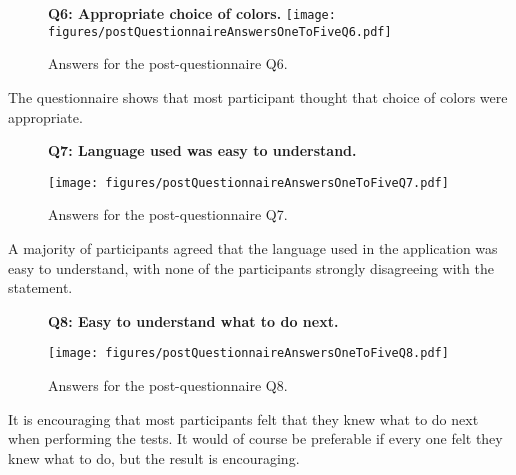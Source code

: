     \begin{figure}[h!]
      \begin{center}
        \textbf{Q6: Appropriate choice of colors.}
        \texttt{[image: figures/postQuestionnaireAnswersOneToFiveQ6.pdf]}
        \vspace{-1cm}
        \caption{Answers for the post-questionnaire Q6.}
      \end{center}
    \end{figure}

    The questionnaire shows that most participant thought that choice of
    colors were appropriate.

    \begin{figure}[h!]
      \textbf{Q7: Language used was easy to understand.}
      \begin{center}
        \texttt{[image: figures/postQuestionnaireAnswersOneToFiveQ7.pdf]}
        \vspace{-1cm}
        \caption{Answers for the post-questionnaire Q7.}
      \end{center}
    \end{figure}

    A majority of participants agreed that the language used in the
    application was easy to understand, with none of the participants
    strongly disagreeing with the statement.

    \begin{figure}[h!]
      \textbf{Q8: Easy to understand what to do next.}
      \begin{center}
        \texttt{[image: figures/postQuestionnaireAnswersOneToFiveQ8.pdf]}
        \vspace{-1cm}
        \caption{Answers for the post-questionnaire Q8.}
      \end{center}
    \end{figure}

    It is encouraging that most participants felt that they knew what to do
    next when performing the tests. It would of course be preferable if
    every one felt they knew what to do, but the result is encouraging.

